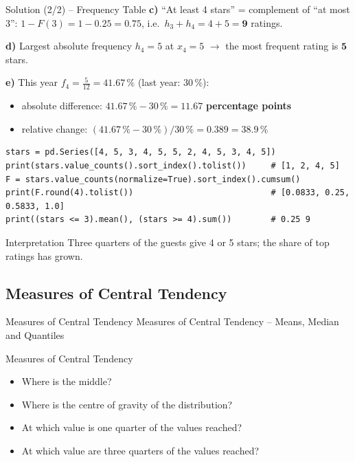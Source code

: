 \documentclass[aspectratio=169,11pt]{beamer}
\begin{document}
\begin{frame}[fragile]{Solution (2/2) -- Frequency Table}
  \lstset{aboveskip=2pt,belowskip=2pt}
  \textbf{c)} ``At least 4 stars'' = complement of ``at most 3'':
  $1 - F(3) = 1 - 0.25 = \mathbf{0.75}$, i.e.\ $h_3 + h_4 = 4 + 5 = \mathbf{9}$ ratings.

  \textbf{d)} Largest absolute frequency $h_4 = 5$ at $x_4 = 5$ $\to$ the most frequent rating is $\mathbf{5}$ stars.

  \textbf{e)} This year $f_4 = \tfrac{5}{12} = 41.67\,\%$ (last year: $30\,\%$):
  \begin{itemize}
    \item absolute difference: $41.67\,\% - 30\,\% = \mathbf{11.67}$ \textbf{percentage points}
    \item relative change: $(41.67\,\% - 30\,\%) / 30\,\% = 0.389 = \mathbf{38.9\,\%}$
  \end{itemize}
\begin{lstlisting}[keepspaces=true]
stars = pd.Series([4, 5, 3, 4, 5, 5, 2, 4, 5, 3, 4, 5])
print(stars.value_counts().sort_index().tolist())     # [1, 2, 4, 5]
F = stars.value_counts(normalize=True).sort_index().cumsum()
print(F.round(4).tolist())                            # [0.0833, 0.25, 0.5833, 1.0]
print((stars <= 3).mean(), (stars >= 4).sum())        # 0.25 9
\end{lstlisting}
  \begin{alertblock}{Interpretation}
    Three quarters of the guests give 4 or 5 stars; the share of top ratings has grown.
  \end{alertblock}
\end{frame}

\subsection{Measures of Central Tendency}

\begin{frame}{Measures of Central Tendency}
  \centering\large\textcolor{hsbiblaudunkel}{Measures of Central Tendency -- Means, Median and Quantiles}
\end{frame}

\begin{frame}{Measures of Central Tendency}
  \begin{itemize}
    \item Where is the middle?
    \item Where is the centre of gravity of the distribution?
    \item At which value is one quarter of the values reached?
    \item At which value are three quarters of the values reached?
  \end{itemize}
\end{frame}
\end{document}
